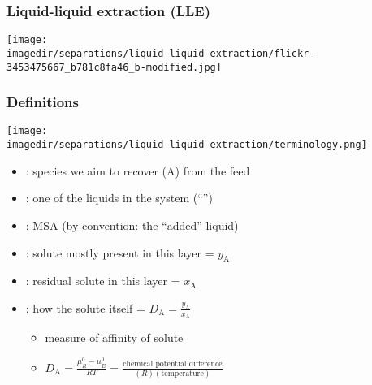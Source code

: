 \begin{frame}\frametitle{Liquid-liquid extraction (LLE)}
	\begin{center}
		\texttt{[image: \\imagedir/separations/liquid-liquid-extraction/flickr-3453475667\_b781c8fa46\_b-modified.jpg]}
	\end{center}
\end{frame}

\begin{frame}\frametitle{Definitions}
	\begin{center}
		\texttt{[image: \\imagedir/separations/liquid-liquid-extraction/terminology.png]}
	\end{center}
	
	\begin{itemize}
		\item	{\color{purple}{solute}}: species we aim to recover (A) from the feed 
		\item	{\color{purple}{feed or ``feed solvent''}}: one of the liquids in the system {\tiny (``{\color{purple}{carrier}}'')}
		\item	{\color{purple}{solvent}}: MSA (by convention: the ``added'' liquid)
		\item	{\color{purple}{extract}}: solute mostly present in this layer = $y_\text{A}$
		\item	{\color{purple}{raffinate}}: residual solute in this layer = $x_\text{A}$
		\item	{\color{purple}{distribution}}: how the solute {\color{purple}{partitions}} itself = $D_\text{A} = \displaystyle \frac{y_\text{A}}{x_\text{A}}$
			\begin{itemize}
				\item	measure of affinity of solute
				\item	$D_\text{A} = \displaystyle \frac{\mu_R^0 - \mu_E^0}{RT} = \displaystyle \frac{\text{chemical potential difference}}{(R)(\text{temperature})}$	%
			\end{itemize}
	\end{itemize}	
\end{frame}

